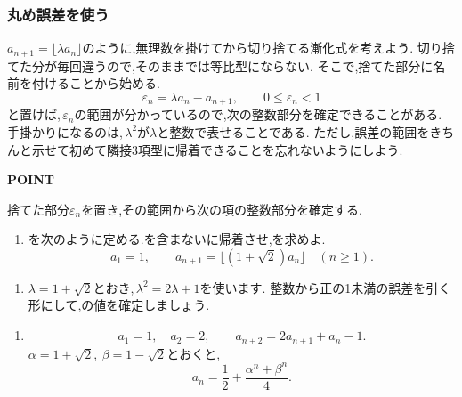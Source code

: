 \subsubsection{丸め誤差を使う}\label{節：丸め誤差を使う}
$a_{n+1}=\lfloor\lambda a_n\rfloor$のように,無理数を掛けてから切り捨てる漸化式を考えよう.
切り捨てた分が毎回違うので,そのままでは等比型にならない.
そこで,捨てた部分に名前を付けることから始める.
\[
  \varepsilon_n=\lambda a_n-a_{n+1},
  \qquad 0\le\varepsilon_n<1
\]
と置けば,\,$\varepsilon_n$の範囲が分かっているので,次の整数部分を確定できることがある.
手掛かりになるのは,\,$\lambda^2$が$\lambda$と整数で表せることである.
ただし,誤差の範囲をきちんと示せて初めて隣接3項型に帰着できることを忘れないようにしよう.

\begin{bookpoint}
  \textbf{POINT}\par
  捨てた部分$\varepsilon_n$を置き,その範囲から次の項の整数部分を確定する.
\end{bookpoint}

\noindent {}\par\nobreak
\begin{enumerate}[label=(\arabic*),parsep=3pt,beginpenalty=10000,format=\bookitemlink{example-gauss-role-5}{problem}{answer}]
  \item {}を次のように定める.を含まないに帰着させ,を求めよ.
    \[
      a_1=1,\qquad
      a_{n+1}=\lfloor(1+\sqrt2)a_n\rfloor
      \quad(n\ge1).
    \]
\end{enumerate}

\noindent {}\par\nobreak
\begin{enumerate}[label=(\arabic*),parsep=3pt,beginpenalty=10000,format=\bookitemlink{example-gauss-role-5}{hint}{problem}]
  \item $\lambda=1+\sqrt2$とおき,\,$\lambda^2=2\lambda+1$を使います.
    整数から正の1未満の誤差を引く形にして,の値を確定しましょう.
\end{enumerate}

\noindent {}\par\nobreak
\begin{enumerate}[label=(\arabic*),parsep=3pt,beginpenalty=10000,format=\bookitemlink{example-gauss-role-5}{answer}{problem}]
  \item \[
      a_1=1,\quad a_2=2,\qquad
      a_{n+2}=2a_{n+1}+a_n-1.
    \]
    $\alpha=1+\sqrt2,\ \beta=1-\sqrt2$とおくと,
    \[
      a_n=\frac12+\frac{\alpha^n+\beta^n}{4}.
    \]
\end{enumerate}

